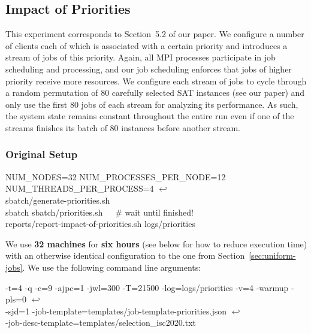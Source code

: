 \documentclass[runningheads]{article}
\newcommand{\CR}{{\tiny$\hookleftarrow$}}
\numberwithin{dummy}{subsection}
\begin{document}
\subsection{Impact of Priorities}

This experiment corresponds to Section~5.2 of our paper.
We configure a number of clients each of which is associated with a certain priority and introduces a stream of jobs of this priority.
Again, all MPI processes participate in job scheduling and processing, and our job scheduling enforces that jobs of higher priority receive more resources.
We configure each stream of jobs to cycle through a random permutation of 80 carefully selected SAT instances (see our paper) and only use the first 80 jobs of each stream for analyzing its performance.
As such, the system state remains constant throughout the entire run even if one of the streams finishes its batch of 80 instances before another stream.

\subsubsection{Original Setup}

\begin{tcolorbox}[
  colback=Magenta!5!white,
  colframe=Magenta!75!black,
  title={\centering Commands for Original Setup}]
\begin{ttfenvcompact}
NUM\_NODES=32 NUM\_PROCESSES\_PER\_NODE=12 NUM\_THREADS\_PER\_PROCESS=4 \CR\\
\hspace*{0.3cm}sbatch/generate-priorities.sh\\
sbatch sbatch/priorities.sh\ \ \ \# wait until finished!\\
reports/report-impact-of-priorities.sh logs/priorities
\end{ttfenvcompact}
\end{tcolorbox}

We use \textbf{32 machines} for \textbf{six hours} (see below for how to reduce execution time) with an otherwise identical configuration to the one from Section~\ref{sec:uniform-jobs}.
We use the following command line arguments:

\begin{ttfenv}
-t=4 -q -c=9 -ajpc=1 -jwl=300 -T=21500 -log=logs/priorities -v=4 -warmup -pls=0 \CR\\
\hspace*{0.3cm}-sjd=1 -job-template=templates/job-template-priorities.json \CR\\
\hspace*{0.3cm}-job-desc-template=templates/selection\_isc2020.txt
\end{ttfenv}
\end{document}
